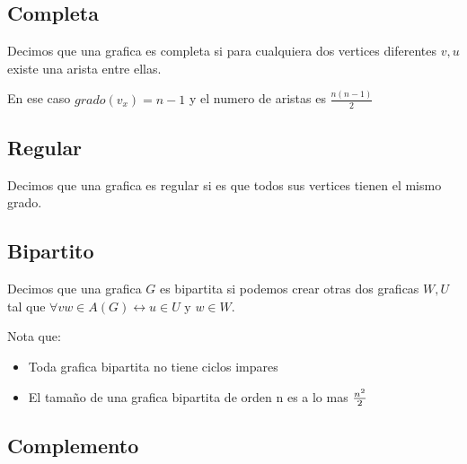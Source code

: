 \documentclass[12pt, fleqn]{report}                             %
\theoremstyle{break}                                            %
\newcommand \lIff    {\leftrightarrow}                          %
\begin{document}
            \subsection{Completa}

                Decimos que una grafica es completa si para cualquiera dos vertices
                diferentes $v, u$ existe una arista entre ellas.

                En ese caso $grado(v_x) = n - 1$
                y el numero de aristas es $\frac{n (n - 1)}{2}$

            \subsection{Regular}

                Decimos que una grafica es regular si es que todos sus vertices tienen
                el mismo grado.

            \subsection{Bipartito}

                Decimos que una grafica $G$ es bipartita si podemos crear otras dos
                graficas $W, U$ tal que $\forall vw \in A(G) \lIff u \in U \text{ y } w \in W$.

                Nota que:
                \begin{itemize}
                    \item Toda grafica bipartita no tiene ciclos impares
                    \item El tamaño de una grafica bipartita de orden n es a lo mas
                    $n^2 \over 2$
                \end{itemize}

            \subsection{Complemento}
\end{document}
